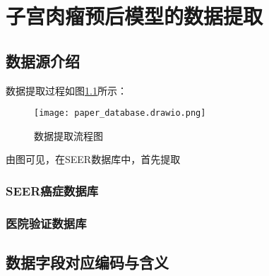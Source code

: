 \chapter{子宫肉瘤预后模型的数据提取}
\label{cha:data}

\section{数据源介绍}

数据提取过程如图\ref{fig:dataset1}所示：

\begin{figure}[!htbp]
    \centering
    \texttt{[image: paper\_database.drawio.png]}
    \caption{数据提取流程图} \label{fig:dataset1}
\end{figure}

由图可见，在SEER数据库中，首先提取

\subsection{SEER癌症数据库}

\subsection{医院验证数据库}

\section{数据字段对应编码与含义}

